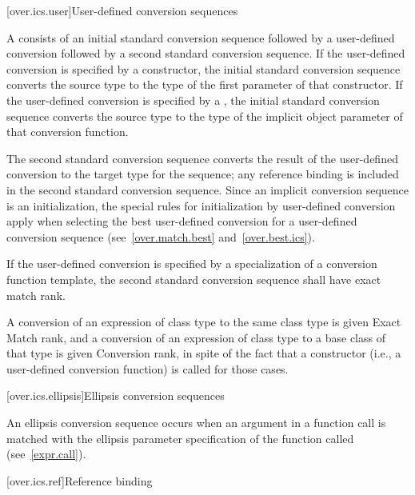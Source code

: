 [over.ics.user]{User-defined conversion sequences}

\pnum
A  consists of an initial
standard conversion sequence followed by a user-defined
conversion followed by a second standard
conversion sequence.
If the user-defined conversion is specified
by a constructor, the initial standard
conversion sequence converts the source type to the type of the
first parameter of that constructor.
If the user-defined
conversion is specified by a , the
initial standard conversion sequence
converts the source type to the type of the
implicit object parameter of that conversion function.

\pnum
The second standard conversion sequence converts the result of
the user-defined conversion to the target type for the sequence;
any reference binding is included in the second standard
conversion sequence.
Since an implicit conversion sequence is an initialization, the
special rules for initialization by user-defined conversion apply
when selecting the best user-defined conversion for a
user-defined conversion sequence (see~\ref{over.match.best} and~\ref{over.best.ics}).

\pnum
If the user-defined conversion is specified by a
specialization of a conversion function template,
the second standard conversion sequence shall have exact match rank.

\pnum
A conversion of an expression of class type
to the same class type is given Exact Match rank, and
a conversion of an expression of class type
to a base class of that type is given Conversion rank,
in spite of the
fact that a constructor (i.e., a user-defined conversion
function) is called for those cases.

[over.ics.ellipsis]{Ellipsis conversion sequences}

\pnum
{}%
An ellipsis conversion sequence occurs when an argument in a
function call is matched with the ellipsis parameter
specification of the function called (see~\ref{expr.call}).

[over.ics.ref]{Reference binding}

